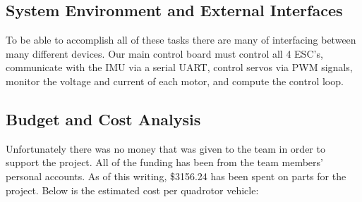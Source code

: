 \documentclass{article}
\numberwithin{equation}{section} %
\begin{document}

\subsection{System Environment and External Interfaces}

To be able to accomplish all of these tasks there are many of interfacing between many different devices. Our main control board must control all 4 ESC's, communicate with the IMU via a serial UART, control servos via PWM signals, monitor the voltage and current of each motor, and compute the control loop.

\subsection{Budget and Cost Analysis}
Unfortunately there was no money that was given to the team in order to support the project. All of the funding has been from the team members' personal accounts. As of this writing, \$3156.24 has been spent on parts for the project. Below is the estimated cost per quadrotor vehicle:
\end{document}

